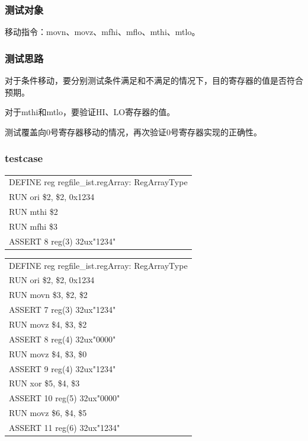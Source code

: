 \documentclass[11pt,utf8]{article}
\begin{document}
{{{\subsubsection{测试对象} {
移动指令：movn、movz、mfhi、mflo、mthi、mtlo。
}
\subsubsection{测试思路} {
对于条件移动，要分别测试条件满足和不满足的情况下，目的寄存器的值是否符合预期。

对于mthi和mtlo，要验证HI、LO寄存器的值。

测试覆盖向0号寄存器移动的情况，再次验证0号寄存器实现的正确性。
}
\subsubsection{testcase} {
\begin{center}	\begin{longtable}{p{15cm}} \hline
		DEFINE{ }reg{ }regfile\_ist.regArray:{ }RegArrayType\\
		RUN{ }ori{ }\$2,{ }\$2,{ }0x1234\\
		RUN{ }mthi{ }\$2\\
		RUN{ }mfhi{ }\$3\\
		ASSERT{ }8{ }reg(3){ }32ux"1234"\\
		\hline \end{longtable} \end{center}
\begin{center}	\begin{longtable}{p{15cm}} \hline
		DEFINE{ }reg{ }regfile\_ist.regArray:{ }RegArrayType\\
		RUN{ }ori{ }\$2,{ }\$2,{ }0x1234\\
		RUN{ }movn{ }\$3,{ }\$2,{ }\$2\\
		ASSERT{ }7{ }reg(3){ }32ux"1234"\\
		RUN{ }movz{ }\$4,{ }\$3,{ }\$2\\
		ASSERT{ }8{ }reg(4){ }32ux"0000"\\
		RUN{ }movz{ }\$4,{ }\$3,{ }\$0\\
		ASSERT{ }9{ }reg(4){ }32ux"1234"\\
		RUN{ }xor{ }\$5,{ }\$4,{ }\$3\\
		ASSERT{ }10{ }reg(5){ }32ux"0000"\\
		RUN{ }movz{ }\$6,{ }\$4,{ }\$5\\
		ASSERT{ }11{ }reg(6){ }32ux"1234"\\
		\hline \end{longtable} \end{center}
}}}}
\end{document}
